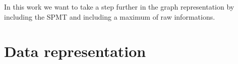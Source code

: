 \documentclass[../main.tex]{subfiles}
\begin{document}
In this work we want to take a step further in the graph representation by including the SPMT and including a maximum of raw informations.

\section{Data representation}
\end{document}

